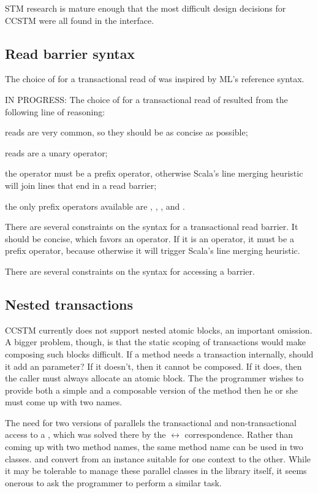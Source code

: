 
STM research is mature enough that the most difficult design decisions
for CCSTM were all found in the interface.

\subsection{Read barrier syntax}

The choice of  for a transactional read of  was inspired by
ML's reference syntax.

IN PROGRESS:
The choice of  for a transactional read of  resulted
from the following line of reasoning:
\begin{packed_enum}
\item reads are very common, so they should be as concise as possible;
\item reads are a unary operator;
\item the operator must be a prefix operator, otherwise Scala's line merging
heuristic will join lines that end in a read barrier;
\item the only prefix operators available are \code{+}, \code{-},
\code{\textasciitilde}, and \code{!}.
\item {} 
\end{packed_enum}
There are several constraints on the syntax for a transactional read barrier.
It should be concise, which favors an operator.  If it is an operator, it must
be a prefix operator, because otherwise it will trigger Scala's line merging
heuristic.

There are several constraints on the syntax for accessing a barrier.  

\subsection{Nested transactions}

CCSTM currently does not support nested atomic blocks, an important
omission.  A bigger problem, though, is that the static scoping
of transactions would make composing such blocks difficult.  If a
method  needs a transaction internally, should it add an
  parameter?  If it doesn't, then it
cannot be composed.  If it does, then the caller must always allocate
an atomic block.  The the programmer wishes to provide both a simple
and a composable version of the method then he or she must come up with
two names.

The need for two versions of  parallels the transactional and
non-transactional access to a , which was solved there by the
 $\leftrightarrow$  correspondence.  Rather than
coming up with two method names, the same method name can be used in
two classes.   and 
convert from an instance suitable for one context to the other.  While it
may be tolerable to manage these parallel classes in the library itself,
it seems onerous to ask the programmer to perform a similar task.

